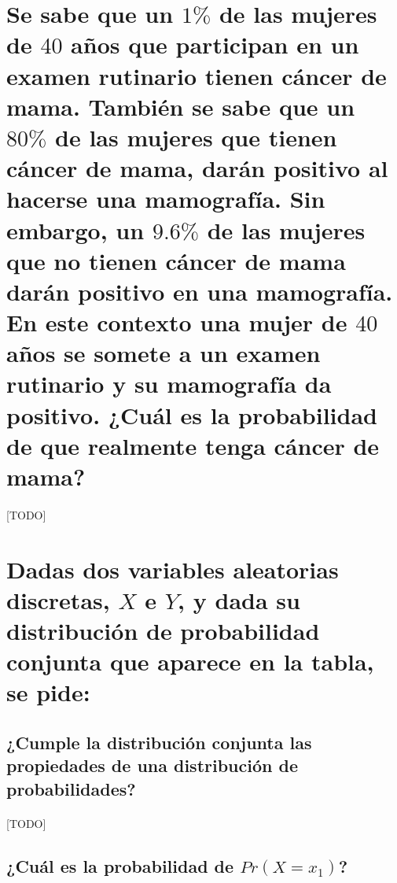 \documentclass{article}
\begin{document}
	\maketitle %

	\thispagestyle{fancy} %



	\begin{abstract}
		\noindent [TODO ]
	\end{abstract}



	\section{Se sabe que un $1\%$ de las mujeres de $40$ años que participan en un examen rutinario tienen cáncer de mama. También se sabe que un $80\%$ de las mujeres que tienen cáncer de mama, darán positivo al hacerse una mamografía. Sin embargo, un $9.6\%$ de las mujeres que no tienen cáncer de mama darán positivo en una mamografía. En este contexto una mujer de $40$ años se somete a un examen rutinario y su mamografía da positivo. ¿Cuál es la probabilidad de que realmente tenga cáncer de mama?}
	\label{sec:e1}

		\paragraph{}
		[TODO]

	\section{Dadas dos variables aleatorias discretas, $X$ e $Y$, y dada su distribución de probabilidad conjunta que aparece en la tabla, se pide:}
	\label{sec:e2}

		\subsection{¿Cumple la distribución conjunta las propiedades de una distribución de probabilidades?}

			\paragraph{}
			[TODO]

		\subsection{¿Cuál es la probabilidad de $Pr(X = x_1)$?}
\end{document}
